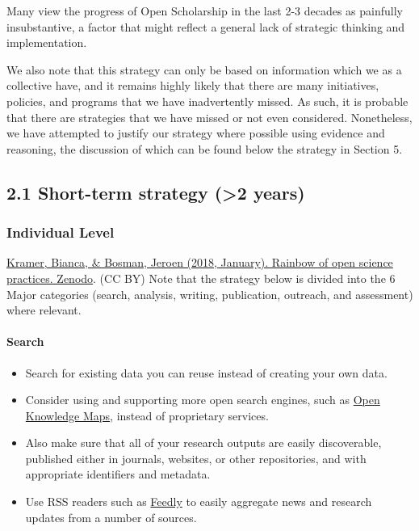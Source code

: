 Many view the progress of Open Scholarship in the last 2-3 decades as
painfully insubstantive, a factor that might reflect a general lack of
strategic thinking and implementation.

We also note that this strategy can only be based on information which
we as a collective have, and it remains highly likely that there are
many initiatives, policies, and programs that we have inadvertently
missed. As such, it is probable that there are strategies that we have
missed or not even considered. Nonetheless, we have attempted to justify
our strategy where possible using evidence and reasoning, the discussion
of which can be found below the strategy in Section 5.

\subsection{2.1 Short-term strategy (\textgreater{}2 years)
}\label{short-term-strategy-2-years}

\subsubsection{Individual Level}\label{individual-level}

\href{https://doi.org/10.5281/zenodo.1147024}{Kramer, Bianca, \& Bosman,
Jeroen (2018, January). Rainbow of open science practices. Zenodo}. (CC
BY) Note that the strategy below is divided into the 6 Major categories
(search, analysis, writing, publication, outreach, and assessment) where
relevant.

\paragraph{Search}\label{search}

\begin{itemize}
\item
  Search for existing data you can reuse instead of creating your own
  data.
\item
  Consider using and supporting more open search engines, such as
  \href{https://openknowledgemaps.org/}{Open Knowledge Maps}, instead of
  proprietary services.
\item
  Also make sure that all of your research outputs are easily
  discoverable, published either in journals, websites, or other
  repositories, and with appropriate identifiers and metadata.
\item
  Use RSS readers such as \href{https://feedly.com/}{Feedly} to easily
  aggregate news and research updates from a number of sources.
\end{itemize}

